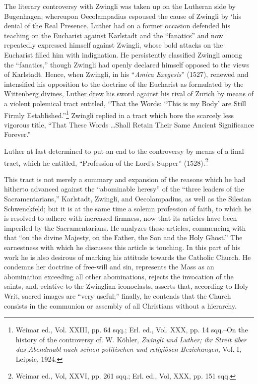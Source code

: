 The literary controversy with Zwingli was taken up on the
Lutheran side by Bugenhagen, whereupon Oecolampadius espoused the
cause of Zwingli by ‘his denial of the Real Presence. Luther had on a
former occasion defended his teaching on the Eucharist against
Karlstadt and the “fanatics” and now repeatedly expressed himself
against Zwingli, whose bold attacks on the Eucharist filled him with
indignation. He persistently classified Zwingli among the “fanatics,”
though Zwingli had openly declared himself opposed to the views
of Karlstadt. Hence, when Zwingli, in his ``\textit{Amica Exegesis}'' (1527),
renewed and intensified his opposition to the doctrine of the Eucharist
as formulated by the Wittenberg divines, Luther drew his sword
against his rival of Zurich by means of a violent polemical tract
entitled, “That the Words: “This is my Body’ are Still Firmly Established.”\footnote
{Weimar ed., Vol. XXIII, pp. 64 sqq.; Erl. ed., Vol. XXX, pp. 14 sqq.--On the history
of the controversy cf. W. Köhler, \textit{Zwingli und Luther; ibr Streit über das Abendmabl nach
seinen politischen und religiösen Bezichungen}, Vol. I, Leipsic, 1924.}
Zwingli replied in a tract which bore the scarcely less
vigorous title, “That These Words \dots Shall Retain Their Same
Ancient Significance Forever.”

Luther at last determined to put an end to the controversy by
means of a final tract, which he entitled, “Profession of the Lord’s
Supper” (1528).\footnote{Weimar ed., Vol, XXVI, pp. 261 sqq.; Erl. ed., Vol, XXX, pp. 151 sqq.}

This tract is not merely a summary and expansion of the reasons which he
had hitherto advanced against the “abominable heresy” of the “three leaders
of the Sacramentarians,” Karlstadt, Zwingli, and Oecolampadius, as well as
the Silesian Schwenckfeld; but it is at the same time a solemn profession of
faith, to which he is resolved to adhere with increased firmness, now that
its articles have been imperiled by the Sacramentarians. He analyzes these
articles, commencing with that “on the divine Majesty, on the Father, the
Son and the Holy Ghost.” The earnestness with which he discusses this
article is touching. In this part of his work he is also desirous of marking his
attitude towards the Catholic Church. He condemns her doctrine of free-will
and sin, represents the Mass as an abomination exceeding all other abominations,
rejects the invocation of the saints, and, relative to the Zwinglian
iconoclasts, asserts that, according to Holy Writ, sacred images are “very
useful;” finally, he contends that the Church consists in the communion or
assembly of all Christians without a hierarchy.

